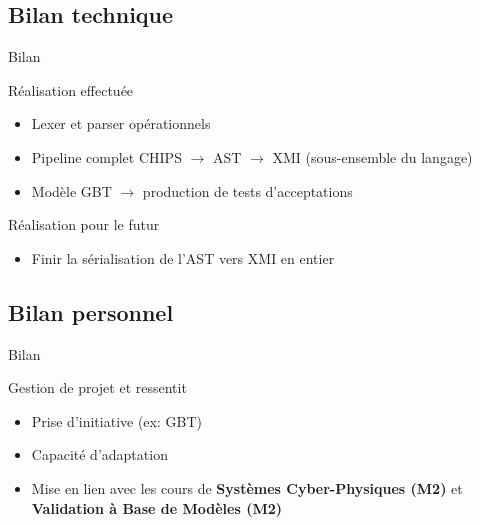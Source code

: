 \subsection{Bilan technique}

\begin{frame}{Bilan}
\begin{block}{Réalisation effectuée}
    \begin{itemize}
        \item Lexer et parser opérationnels
        \item Pipeline complet CHIPS $\xrightarrow{}$ AST $\xrightarrow{}$ XMI (sous-ensemble du langage)
        \item Modèle GBT $\xrightarrow{}$ production de tests d'acceptations
    \end{itemize}
\end{block}

\begin{block}{Réalisation pour le futur}
    \begin{itemize}
        \item Finir la sérialisation de l'AST vers XMI en entier
    \end{itemize}
\end{block}
\end{frame}

\subsection{Bilan personnel}

\begin{frame}{Bilan}

\begin{block}{Gestion de projet et ressentit}
    \begin{itemize}
        \item Prise d'initiative (ex: GBT)
        \item Capacité d'adaptation
        \item Mise en lien avec les cours de \textbf{Systèmes Cyber-Physiques (M2)} et \textbf{Validation à Base de Modèles (M2)} 
    \end{itemize}
\end{block}
    
\end{frame}